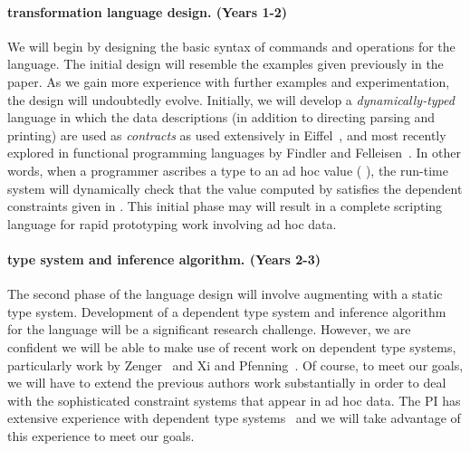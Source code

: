 \documentclass[11pt]{article}
\begin{document}



\paragraph*{\datatype{} transformation language design. (Years 1-2)}
We will begin by designing the basic syntax of commands and operations
for the language.  The initial design will resemble the examples
given previously in the paper.  As we gain more experience with further
examples and experimentation, the design will undoubtedly evolve.
Initially, we will develop a {\em dynamically-typed} language in which
the data descriptions (in addition to directing parsing and printing)
are used as {\em contracts} as used extensively in 
Eiffel~\cite{eiffel}, and most recently explored in functional
programming languages by Findler and 
Felleisen~\cite{findler+:contracts}.  In other words, when 
a programmer ascribes a type to an ad hoc
value (\eg{} ), the run-time system will dynamically 
check that the value computed by  satisfies
the dependent constraints given in .  
This initial phase may will result in a complete scripting language
for rapid prototyping work involving ad hoc data.  

\paragraph*{\datatype{} type system and inference algorithm. (Years 2-3)}
The second phase of the language design will involve augmenting 
\datatype with a static type system.  Development of a dependent
type system and inference algorithm for the language will be a
significant research challenge.  However, we are confident we will be
able to make use of recent work on dependent type systems,
particularly work by Zenger~\cite{zenger:indexed-types} and Xi and
Pfenning~\cite{xi+:dml}.  Of course, to meet our goals, we will have
to extend the previous authors work substantially in order to deal
with the sophisticated constraint systems that appear in ad hoc data.
The PI has extensive experience with dependent type
systems~\cite{walker:popl00,smith+:alias,walker+:capabilities,mandelbaum+:effective-refinements,ahmed+:hierarchical,tan+:tcs04}
and we will take advantage of this experience to meet our goals.
\end{document}
